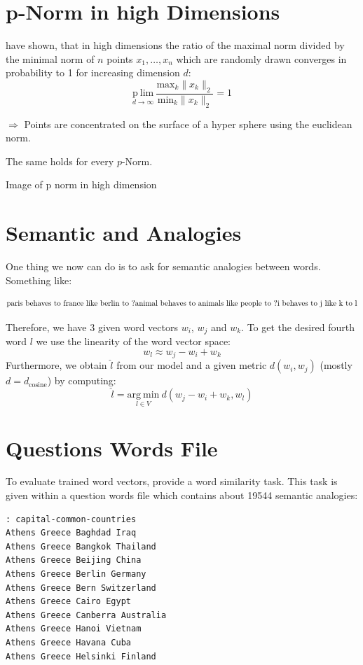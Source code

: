 \section{p-Norm in high Dimensions}

\cite{aggarwal2001surprising} have shown, that in high dimensions the ratio of the 
maximal norm divided by the minimal norm of $n$ points $x_1, \dots, x_n$
which are randomly drawn converges in probability to 1 for increasing
dimension $d$:
\[
\underset{{d\rightarrow\infty}}{\mathrm{p~lim}}\ \frac{\mathrm{max}_k \|x_k\|_2}{\mathrm{min}_k \|x_k\|_2} = 1
\]

$\Rightarrow$ Points are concentrated on the surface of a hyper sphere 
using the euclidean norm.

The same holds for every $p$-Norm.


{\Huge Image of p norm in high dimension}

\section{Semantic and Analogies}

One thing we now can do is to ask for semantic analogies between words. 
Something like:

\[
\mathrm{paris\ behaves\ to\ france\ like\ berlin\ to\ ?} \\
\mathrm{animal\ behaves\ to\ animals\ like\ people\ to\ ?} \\
\mathrm{i\ behaves\ to\ j\ like\ k\ to\ l} 
\]

Therefore, we have $3$ given word vectors $w_i$, $w_j$ and $w_k$. To get the 
desired fourth word $l$ we use the linearity of the word vector space:
\[
w_l \approx w_j - w_i + w_k
\]
Furthermore, we obtain $\widehat{l}$ from our model and a given metric 
$d(w_i, w_j)$ (mostly $d = d_\mathrm{cosine}$) by computing:
\[
\widehat{l} = \underset{l \in V}{\mathrm{arg~min}}\ d(w_j - w_i + w_k, w_l)
\]


\section{Questions Words File}

To evaluate trained word vectors, \cite{mikolov2013efficient} provide a word
similarity task. This task is given within a question words file which
contains about 19544 semantic analogies:

\begin{Shaded}
\begin{verbatim}
: capital-common-countries
Athens Greece Baghdad Iraq
Athens Greece Bangkok Thailand
Athens Greece Beijing China
Athens Greece Berlin Germany
Athens Greece Bern Switzerland
Athens Greece Cairo Egypt
Athens Greece Canberra Australia
Athens Greece Hanoi Vietnam
Athens Greece Havana Cuba
Athens Greece Helsinki Finland
\end{verbatim}
\end{Shaded}

